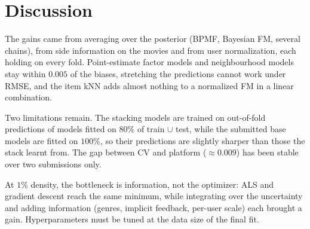 \documentclass[11pt,a4paper]{article}
\begin{document}
\section{Discussion}

The gains came from averaging over the posterior (BPMF, Bayesian FM, several chains), from side information
on the movies and from user normalization, each holding on every fold. Point-estimate factor models and
neighbourhood models stay within $0.005$ of the biases, stretching the predictions cannot work under RMSE,
and the item kNN adds almost nothing to a normalized FM in a linear combination.

Two limitations remain. The stacking models are trained on out-of-fold predictions of models fitted on $80\%$
of train $\cup$ test, while the submitted base models are fitted on $100\%$, so their predictions are slightly
sharper than those the stack learnt from. The gap between CV and platform ($\approx 0.009$) has been stable over
two submissions only.

At $1\%$ density, the bottleneck is information, not the optimizer: ALS and gradient descent reach the same
minimum, while integrating over the uncertainty and adding information (genres, implicit feedback, per-user
scale) each brought a gain. Hyperparameters must be tuned at the data size of the final fit.
\end{document}
